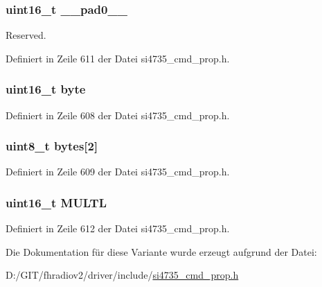 \subsubsection[{\+\_\+\+\_\+pad0\+\_\+\+\_\+}]{\setlength{\rightskip}{0pt plus 5cm}uint16\+\_\+t \+\_\+\+\_\+pad0\+\_\+\+\_\+}\label{unionfm__rsq__multi__lo__thres_a77132c2c26a75f5b8751b235cda23828}


Reserved. 



Definiert in Zeile 611 der Datei si4735\+\_\+cmd\+\_\+prop.\+h.

\hypertarget{unionfm__rsq__multi__lo__thres_ab0549c1b5ea980a02e7eab77e21fea49}{}
\subsubsection[{byte}]{\setlength{\rightskip}{0pt plus 5cm}uint16\+\_\+t byte}\label{unionfm__rsq__multi__lo__thres_ab0549c1b5ea980a02e7eab77e21fea49}


Definiert in Zeile 608 der Datei si4735\+\_\+cmd\+\_\+prop.\+h.

\hypertarget{unionfm__rsq__multi__lo__thres_a46e4c05d20a047ec169f60d3167e912e}{}
\subsubsection[{bytes}]{\setlength{\rightskip}{0pt plus 5cm}uint8\+\_\+t bytes\mbox{[}2\mbox{]}}\label{unionfm__rsq__multi__lo__thres_a46e4c05d20a047ec169f60d3167e912e}


Definiert in Zeile 609 der Datei si4735\+\_\+cmd\+\_\+prop.\+h.

\hypertarget{unionfm__rsq__multi__lo__thres_aedafc0a3e30016fbf04b9fee188567c8}{}
\subsubsection[{M\+U\+L\+T\+L}]{\setlength{\rightskip}{0pt plus 5cm}uint16\+\_\+t M\+U\+L\+T\+L}\label{unionfm__rsq__multi__lo__thres_aedafc0a3e30016fbf04b9fee188567c8}


Definiert in Zeile 612 der Datei si4735\+\_\+cmd\+\_\+prop.\+h.



Die Dokumentation für diese Variante wurde erzeugt aufgrund der Datei\+:\begin{DoxyCompactItemize}
\item 
D\+:/\+G\+I\+T/fhradiov2/driver/include/\hyperlink{si4735__cmd__prop_8h}{si4735\+\_\+cmd\+\_\+prop.\+h}\end{DoxyCompactItemize}
